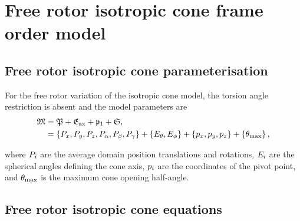 \section{Free rotor isotropic cone frame order model}


\subsection{Free rotor isotropic cone parameterisation}

For the free rotor variation of the isotropic cone model, the torsion angle restriction is absent and the model parameters are
\begin{subequations}
\begin{align}
    \mathfrak{M} &= \mathfrak{P} + \mathfrak{E}_\textrm{ax} + \mathfrak{p}_1 + \mathfrak{S}, \\
              &= \left\{ P_x, P_y, P_z, P_\alpha, P_\beta, P_\gamma \right\} + \left\{ E_\theta, E_\phi \right\} + \left\{ p_x, p_y, p_z \right\} + \left\{ \theta_\textrm{max} \right\} ,
\end{align}
\end{subequations}

where $P_i$ are the average domain position translations and rotations, $E_i$ are the spherical angles defining the cone axis, $p_i$ are the coordinates of the pivot point, and $\theta_\textrm{max}$ is the maximum cone opening half-angle.


\subsection{Free rotor isotropic cone equations}

